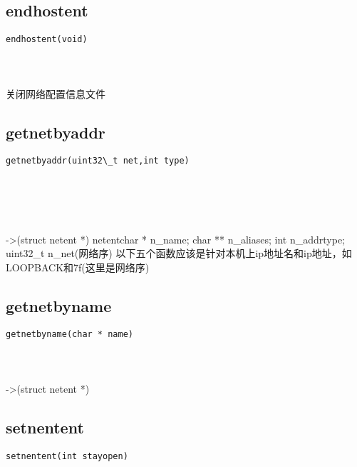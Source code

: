 \documentclass[10pt,a4paper]{article}
\begin{document}
\subsection{endhostent}
\begin{spacing}{2.0}
\lstset{language=C,numbers=none}
\begin{lstlisting}
endhostent(void)
\end{lstlisting}
{\large\color[rgb]{0.2,0.4,0.6}{void:}}
\paragraph{ \ \ }关闭网络配置信息文件
\end{spacing}

\subsection{getnetbyaddr}
\begin{spacing}{2.0}
\lstset{language=C,numbers=none}
\begin{lstlisting}
getnetbyaddr(uint32\_t net,int type)
\end{lstlisting}
{\large\color[rgb]{0.2,0.4,0.6}{net:}} \\
{\large\color[rgb]{0.2,0.4,0.6}{type:}}
\paragraph{ \ \ }->(struct netent *) netent{char * n\_name; char ** n\_aliases; int n\_addrtype; uint32\_t n\_net(网络序)} 以下五个函数应该是针对本机上ip地址名和ip地址，如LOOPBACK和7f(这里是网络序)
\end{spacing}

\subsection{getnetbyname}
\begin{spacing}{2.0}
\lstset{language=C,numbers=none}
\begin{lstlisting}
getnetbyname(char * name)
\end{lstlisting}
{\large\color[rgb]{0.2,0.4,0.6}{name:}}
\paragraph{ \ \ }->(struct netent *)
\end{spacing}

\subsection{setnentent}
\begin{spacing}{2.0}
\lstset{language=C,numbers=none}
\begin{lstlisting}
setnentent(int stayopen)
\end{lstlisting}
{\large\color[rgb]{0.2,0.4,0.6}{stayopen:}}
\paragraph{ \ \ }
\end{spacing}
\end{document}
